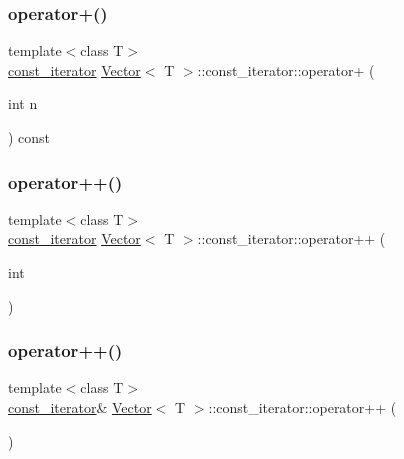 \subsubsection{\texorpdfstring{operator+()}{operator+()}}
{\footnotesize\ttfamily template$<$class T$>$ \\
\hyperlink{classVector_1_1const__iterator}{const\+\_\+iterator} \hyperlink{classVector}{Vector}$<$ T $>$\+::const\+\_\+iterator\+::operator+ (\begin{DoxyParamCaption}\item[{int}]{n }\end{DoxyParamCaption}) const\hspace{0.3cm}{\ttfamily [inline]}}

\mbox{\label{classVector_1_1const__iterator_a67456e47c6bd9b973893d4c367dc6a46_a67456e47c6bd9b973893d4c367dc6a46}} 
\subsubsection{\texorpdfstring{operator++()}{operator++()}\hspace{0.1cm}{\footnotesize\ttfamily [1/2]}}
{\footnotesize\ttfamily template$<$class T$>$ \\
\hyperlink{classVector_1_1const__iterator}{const\+\_\+iterator} \hyperlink{classVector}{Vector}$<$ T $>$\+::const\+\_\+iterator\+::operator++ (\begin{DoxyParamCaption}\item[{int}]{ }\end{DoxyParamCaption})\hspace{0.3cm}{\ttfamily [inline]}}

\mbox{\label{classVector_1_1const__iterator_a2f031ab9801a4c42de40b95b855bacd6_a2f031ab9801a4c42de40b95b855bacd6}} 
\subsubsection{\texorpdfstring{operator++()}{operator++()}\hspace{0.1cm}{\footnotesize\ttfamily [2/2]}}
{\footnotesize\ttfamily template$<$class T$>$ \\
\hyperlink{classVector_1_1const__iterator}{const\+\_\+iterator}\& \hyperlink{classVector}{Vector}$<$ T $>$\+::const\+\_\+iterator\+::operator++ (\begin{DoxyParamCaption}{ }\end{DoxyParamCaption})\hspace{0.3cm}{\ttfamily [inline]}}

